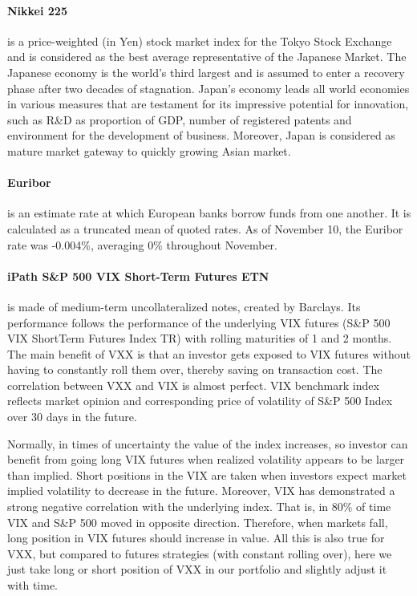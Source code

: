 \documentclass[11pt, parskip=full, DIV=14]{scrreprt}
\begin{document}
\paragraph{Nikkei 225} is a price-weighted (in Yen) stock market index for the Tokyo Stock Exchange and is considered as the best average representative of the Japanese Market.
The Japanese economy is the world’s third largest and is assumed to enter a recovery phase after two decades of stagnation.
Japan's economy leads all world economies in various measures that are testament for its impressive potential for innovation, such as R\&D as proportion of GDP, number of registered patents and environment for the development of business.
Moreover, Japan is considered as mature market gateway to quickly growing Asian market.

\paragraph{Euribor} is an estimate rate at which European banks borrow funds from one another.
It is calculated as a truncated mean of quoted rates.
As of November 10, the Euribor rate was -0.004\%, averaging 0\% throughout November.

\begin{figure}
  \centering
\end{figure}
%
\paragraph{iPath S\&P 500 VIX Short-Term Futures ETN} is made of medium-term uncollateralized notes, created by Barclays. Its performance follows the performance of the underlying VIX futures (S\&P 500 VIX ShortTerm Futures Index TR) with rolling maturities of 1 and 2 months.
The main benefit of VXX is that an investor gets exposed to VIX futures without having to constantly roll them over, thereby saving on transaction cost. The correlation between VXX and VIX is almost perfect.
VIX benchmark index reflects market opinion and corresponding price of volatility of S\&P 500 Index over 30 days in the future.


Normally, in times of uncertainty the value of the index increases, so investor can benefit from going long VIX futures when realized volatility appears to be larger than implied.
Short positions in the VIX are taken when investors expect market implied volatility to decrease in the future.
Moreover, VIX has demonstrated a strong negative correlation with the underlying index.
That is, in 80\% of time VIX and S\&P 500 moved in opposite direction.
Therefore, when markets fall, long position in VIX futures should increase in value.
All this is also true for VXX, but compared to futures strategies (with constant rolling over), here we just take long or short position of VXX in our portfolio and slightly adjust it with time.
\end{document}
